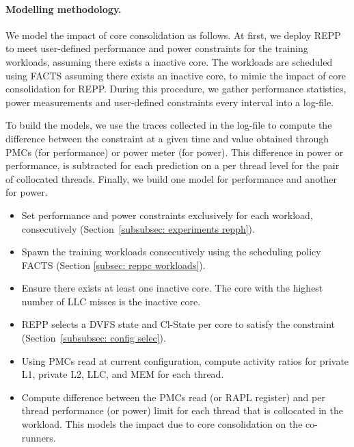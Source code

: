 \paragraph{Modelling methodology.}

 We model the impact of core consolidation as follows. At first, we deploy
\textsf{REPP} to meet user-defined performance and power constraints for the training
workloads, assuming there exists a inactive core. The workloads are scheduled using FACTS
assuming there exists an inactive core, to mimic the impact of core consolidation for
REPP.  During this procedure, we gather performance statistics, power measurements and
user-defined constraints every interval into a log-file.

To build the models, we use the traces collected in the log-file to compute the difference
between the constraint at a given time and value obtained through PMCs (for performance)
or power meter (for power). This difference in power or performance, is subtracted for
each prediction on a per thread level for the pair of collocated threads.  Finally, we
build one model for performance and another for power.  


\begin{itemize}

    \item[{\small \circled{1}}] Set performance and power constraints exclusively for each
        workload, consecutively (Section~\ref{subsubsec: experiments repph}). 

    \item[{\small \circled{2}}] Spawn the training workloads consecutively using the
        scheduling policy FACTS (Section \ref{subsec: reppc workloads}).

    \item[{\small \circled{3}}] Ensure there exists at least one inactive core. The core
        with the highest number of LLC misses is the inactive core.

    \item[{\small \circled{4}}] REPP selects a DVFS state and Cl-State per core to satisfy
        the constraint (Section~\ref{subsubsec: config selec}).  %

    \item[{\small \circled{5}}] Using PMCs read at current configuration, compute activity
        ratios for private L1, private L2, LLC, and MEM for each thread.

    \item[{\small \circled{6}}] Compute difference between the PMCs read (or RAPL
register) and per thread performance (or power) limit for each thread that is collocated
in the workload. This models the impact due to core consolidation on the co-runners.

\end{itemize}

